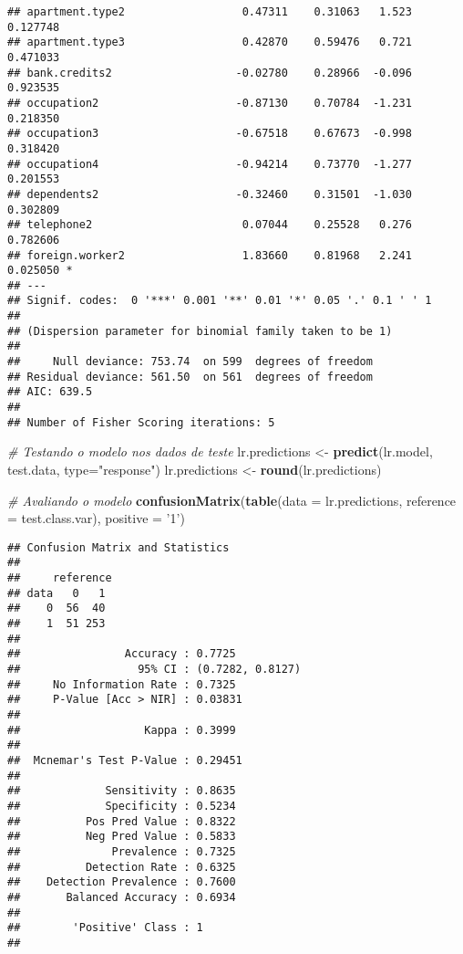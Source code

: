 \documentclass[
]{article}
\newenvironment{Shaded}{\begin{snugshade}}{\end{snugshade}}
\newcommand{\CommentTok}[1]{\textcolor[rgb]{0.56,0.35,0.01}{\textit{#1}}}
\newcommand{\DataTypeTok}[1]{\textcolor[rgb]{0.13,0.29,0.53}{#1}}
\newcommand{\KeywordTok}[1]{\textcolor[rgb]{0.13,0.29,0.53}{\textbf{#1}}}
\newcommand{\NormalTok}[1]{#1}
\newcommand{\StringTok}[1]{\textcolor[rgb]{0.31,0.60,0.02}{#1}}
\begin{document}
\begin{verbatim}
## apartment.type2                  0.47311    0.31063   1.523 0.127748    
## apartment.type3                  0.42870    0.59476   0.721 0.471033    
## bank.credits2                   -0.02780    0.28966  -0.096 0.923535    
## occupation2                     -0.87130    0.70784  -1.231 0.218350    
## occupation3                     -0.67518    0.67673  -0.998 0.318420    
## occupation4                     -0.94214    0.73770  -1.277 0.201553    
## dependents2                     -0.32460    0.31501  -1.030 0.302809    
## telephone2                       0.07044    0.25528   0.276 0.782606    
## foreign.worker2                  1.83660    0.81968   2.241 0.025050 *  
## ---
## Signif. codes:  0 '***' 0.001 '**' 0.01 '*' 0.05 '.' 0.1 ' ' 1
## 
## (Dispersion parameter for binomial family taken to be 1)
## 
##     Null deviance: 753.74  on 599  degrees of freedom
## Residual deviance: 561.50  on 561  degrees of freedom
## AIC: 639.5
## 
## Number of Fisher Scoring iterations: 5
\end{verbatim}

\begin{Shaded}
\begin{Highlighting}[]
\CommentTok{# Testando o modelo nos dados de teste}
\NormalTok{lr.predictions <-}\StringTok{ }\KeywordTok{predict}\NormalTok{(lr.model, test.data, }\DataTypeTok{type=}\StringTok{"response"}\NormalTok{)}
\NormalTok{lr.predictions <-}\StringTok{ }\KeywordTok{round}\NormalTok{(lr.predictions)}

\CommentTok{# Avaliando o modelo}
\KeywordTok{confusionMatrix}\NormalTok{(}\KeywordTok{table}\NormalTok{(}\DataTypeTok{data =}\NormalTok{ lr.predictions, }\DataTypeTok{reference =}\NormalTok{ test.class.var), }\DataTypeTok{positive =} \StringTok{'1'}\NormalTok{)}
\end{Highlighting}
\end{Shaded}

\begin{verbatim}
## Confusion Matrix and Statistics
## 
##     reference
## data   0   1
##    0  56  40
##    1  51 253
##                                           
##                Accuracy : 0.7725          
##                  95% CI : (0.7282, 0.8127)
##     No Information Rate : 0.7325          
##     P-Value [Acc > NIR] : 0.03831         
##                                           
##                   Kappa : 0.3999          
##                                           
##  Mcnemar's Test P-Value : 0.29451         
##                                           
##             Sensitivity : 0.8635          
##             Specificity : 0.5234          
##          Pos Pred Value : 0.8322          
##          Neg Pred Value : 0.5833          
##              Prevalence : 0.7325          
##          Detection Rate : 0.6325          
##    Detection Prevalence : 0.7600          
##       Balanced Accuracy : 0.6934          
##                                           
##        'Positive' Class : 1               
## 
\end{verbatim}
\end{document}
